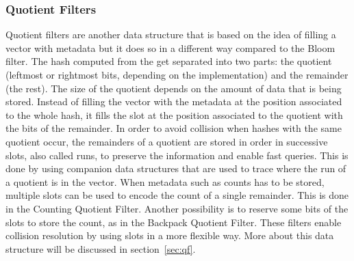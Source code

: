 \subsubsection{Quotient Filters}
\label{sec:introduction_qf}
Quotient filters are another data structure that is based on the idea of filling a vector with metadata but it does so in a different way compared to the Bloom filter.
The hash computed from the \kmer get separated into two parts: the quotient (leftmost or rightmost bits, depending on the implementation) and the remainder (the rest). The size of the quotient depends on the amount of data that is being stored. Instead of filling the vector with the metadata at the position associated to the whole hash, it fills the slot at the position associated to the quotient with the bits of the remainder. In order to avoid collision when hashes with the same quotient occur, the remainders of a quotient are stored in order in successive slots, also called runs, to preserve the information and enable fast queries. This is done by using companion data structures that are used to trace where the run of a quotient is in the vector. When metadata such as counts has to be stored, multiple slots can be used to encode the count of a single remainder. This is done in the Counting Quotient Filter. Another possibility is to reserve some bits of the slots to store the count, as in the Backpack Quotient Filter.
These filters enable collision resolution by using slots in a more flexible way. More about this data structure will be discussed in section~\ref{sec:qf}.

